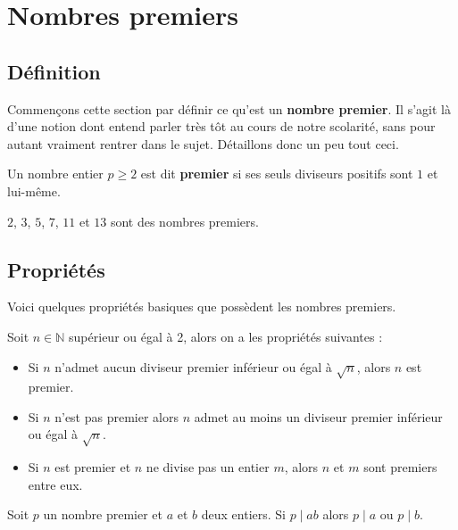	\section{Nombres premiers}
	
	\subsection{Définition}
	
	Commençons cette section par définir ce qu'est un \textbf{nombre premier}. Il s'agit là d'une notion dont entend parler très tôt au cours de notre scolarité, sans pour autant vraiment rentrer dans le sujet. Détaillons donc un peu tout ceci.
	
	\begin{formula}
		Un nombre entier $p \geq 2$ est dit \textbf{premier} si ses seuls diviseurs positifs sont $1$ et lui-même.
	\end{formula}
	
	\begin{tip}[Exemple]
		$2$, $3$, $5$, $7$, $11$ et $13$ sont des nombres premiers.
	\end{tip}
	
	\subsection{Propriétés}
	
	Voici quelques propriétés basiques que possèdent les nombres premiers.
	
	\begin{formula}[Propriétés]
		Soit $n \in \mathbb{N}$ supérieur ou égal à 2, alors on a les propriétés suivantes :
		\begin{itemize}
			\item Si $n$ n'admet aucun diviseur premier inférieur ou égal à $\sqrt{n}$, alors $n$ est premier.
			\item Si $n$ n'est pas premier alors $n$ admet au moins un diviseur premier inférieur ou égal à $\sqrt{n}$.
			\item Si $n$ est premier et $n$ ne divise pas un entier $m$, alors $n$ et $m$ sont premiers entre eux.
		\end{itemize}
	\end{formula}
	
	\begin{formula}
		Soit $p$ un nombre premier et $a$ et $b$ deux entiers. Si $p \mid ab$ alors $p \mid a$ ou $p \mid b$.
	\end{formula}
	
